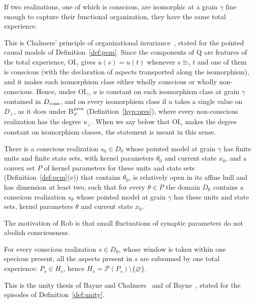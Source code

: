 \begin{definition}\label{hyp:OI}
If two realizations, one of which is conscious, are isomorphic at a grain $\gamma$ fine enough to capture their functional organization, they have the same total experience.
\end{definition}
This is Chalmers' principle of organizational invariance~\cite{Chalmers1995}, stated for the pointed causal models of Definition~\ref{def:pcm}. Since the components of Q are features of the total experience, OI$_\gamma$ gives $u(s)=u(t)$ whenever $s\cong_\gamma t$ and one of them is conscious (with the declaration of aspects transported along the isomorphism), and it makes each isomorphism class either wholly conscious or wholly non-conscious. Hence, under OI$_\gamma$, $u$ is constant on each isomorphism class at grain $\gamma$ contained in $D_{\rm cons}$, and on every isomorphism class if $u$ takes a single value on $D_\bot$, as it does under B$_\psi^{\rm pres}$ (Definition~\ref{hyp:pres}), where every non-conscious realization has the degree $u_\bot$. When we say below that OI$_\gamma$ makes the degree constant on isomorphism classes, the statement is meant in this sense.

\begin{definition}\label{hyp:Rob}
There is a conscious realization $s_0\in D_0$ whose pointed model at grain $\gamma$ has finite units and finite state sets, with kernel parameters $\theta_0$ and current state $x_0$, and a convex set $P$ of kernel parameters for these units and state sets (Definition~\ref{def:pcm}(e)) that contains $\theta_0$, is relatively open in its affine hull and has dimension at least two, such that for every $\theta\in P$ the domain $D_0$ contains a conscious realization $s_\theta$ whose pointed model at grain $\gamma$ has these units and state sets, kernel parameters $\theta$ and current state $x_0$.
\end{definition}
The motivation of Rob is that small fluctuations of synaptic parameters do not abolish consciousness.

\begin{definition}\label{hyp:UT}
For every conscious realization $s\in D_0$, whose window is taken within one specious present, all the aspects present in $s$ are subsumed by one total experience: $P_s\in H_s$, hence $H_s=\mathcal P(P_s)\setminus\{\varnothing\}$.
\end{definition}
This is the unity thesis of Bayne and Chalmers~\cite{BayneChalmers2003} and of Bayne~\cite{Bayne2010}, stated for the episodes of Definition~\ref{def:unity}.

